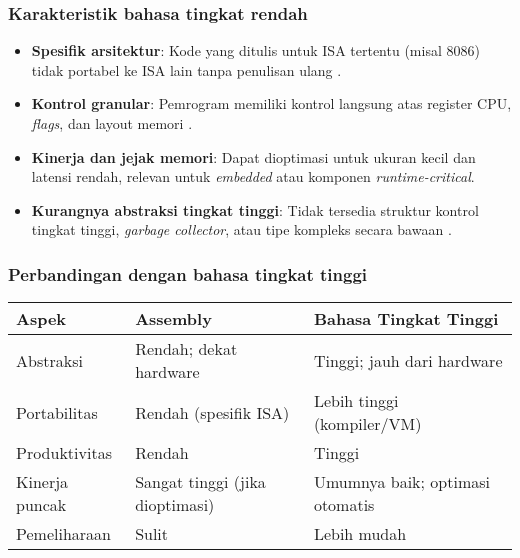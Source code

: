 \subsubsection{Karakteristik bahasa tingkat rendah}
\begin{itemize}
    \item \textbf{Spesifik arsitektur}: Kode yang ditulis untuk ISA tertentu (misal 8086) tidak portabel ke ISA lain tanpa penulisan ulang \cite{susanto1995belajar}.
    \item \textbf{Kontrol granular}: Pemrogram memiliki kontrol langsung atas register CPU, \textit{flags}, dan layout memori \cite{hyde2010art}.
    \item \textbf{Kinerja dan jejak memori}: Dapat dioptimasi untuk ukuran kecil dan latensi rendah, relevan untuk \textit{embedded} atau komponen \textit{runtime-critical}.
    \item \textbf{Kurangnya abstraksi tingkat tinggi}: Tidak tersedia struktur kontrol tingkat tinggi, \textit{garbage collector}, atau tipe kompleks secara bawaan \cite{susanto1995belajar}.
\end{itemize}

\subsubsection{Perbandingan dengan bahasa tingkat tinggi}
\begin{center}
\begin{tabular}{p{} p{} p{}}
\hline
\textbf{Aspek} & \textbf{Assembly} & \textbf{Bahasa Tingkat Tinggi} \\
\hline
Abstraksi & Rendah; dekat hardware & Tinggi; jauh dari hardware \\
Portabilitas & Rendah (spesifik ISA) & Lebih tinggi (kompiler/VM) \\
Produktivitas & Rendah & Tinggi \\
Kinerja puncak & Sangat tinggi (jika dioptimasi) & Umumnya baik; optimasi otomatis \\
Pemeliharaan & Sulit & Lebih mudah \\
\hline
\end{tabular}
\end{center}

